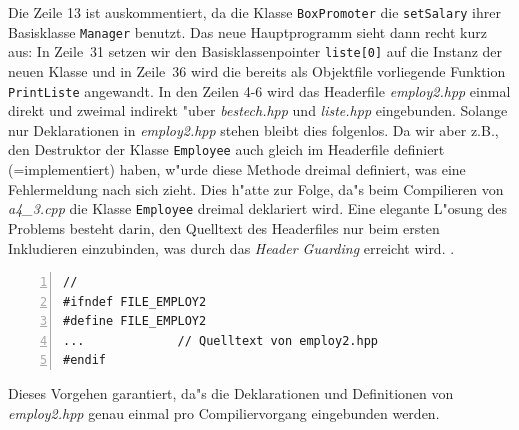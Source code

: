 %
Die Zeile 13 ist auskommentiert, da die Klasse \verb|BoxPromoter|
die \verb|setSalary| ihrer Basisklasse \verb|Manager| benutzt.
Das neue Hauptprogramm sieht dann recht kurz aus:
%
%
% 
% 
% 
% 
% 
% 
% 
% 
% 
% 
In Zeile~31 setzen wir den Basisklassenpointer \verb|liste[0]| auf
die Instanz der neuen Klasse und in Zeile~36 wird die bereits
als Objektfile vorliegende Funktion \texttt{PrintListe} angewandt.
In den Zeilen 4-6 wird das Headerfile \textit{employ2.hpp} einmal direkt und
zweimal indirekt "uber \textit{bestech.hpp} und \textit{liste.hpp} eingebunden.
Solange nur Deklarationen in \textit{employ2.hpp} stehen bleibt dies folgenlos.
Da wir aber z.B., den Destruktor der Klasse \verb|Employee| auch gleich im
Headerfile definiert (=implementiert) haben, w"urde diese Methode dreimal
definiert, was eine Fehlermeldung nach sich zieht.
Dies h"atte zur Folge, da"s beim Compilieren von \textit{a4\_3.cpp} die Klasse
\verb|Employee| dreimal deklariert wird. Eine elegante L"osung des Problems besteht
darin, den Quelltext des Headerfiles nur beim ersten Inkludieren einzubinden, was durch das \emph{Header Guarding} erreicht wird.
.
\begin{lstlisting}[caption={Header Guarding},label=lst:header_guard,
basicstyle=\scriptsize,numbers=left, numberstyle=\tiny, stepnumber=2, numbersep=5pt]
//
#ifndef FILE_EMPLOY2
#define FILE_EMPLOY2
...				// Quelltext von employ2.hpp
#endif
\end{lstlisting}
Dieses Vorgehen garantiert, da"s die Deklarationen und Definitionen von
\textit{employ2.hpp} genau einmal pro Compiliervorgang eingebunden werden.

